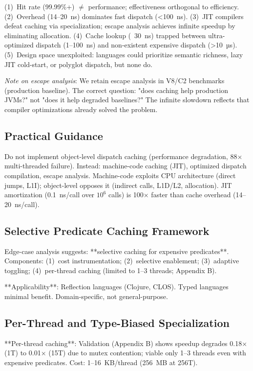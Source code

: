 \documentclass[sigplan,final,acmsmall,review,screen]{acmart}
\begin{document}
(1)~Hit rate (99.99\%+) $\neq$ performance; effectiveness orthogonal to efficiency. (2)~Overhead (14--20~ns) dominates fast dispatch (<100~ns). (3)~JIT compilers defeat caching via specialization; escape analysis achieves infinite speedup by eliminating allocation. (4)~Cache lookup (~30~ns) trapped between ultra-optimized dispatch (1--100~ns) and non-existent expensive dispatch (>10~µs). (5)~Design space unexploited: languages could prioritize semantic richness, lazy JIT cold-start, or polyglot dispatch, but none do.

\textit{Note on escape analysis}: We retain escape analysis in V8/C2 benchmarks (production baseline). The correct question: "does caching help production JVMs?" not "does it help degraded baselines?" The infinite slowdown reflects that compiler optimizations already solved the problem.

\subsection{Practical Guidance}

Do not implement object-level dispatch caching (performance degradation, 88× multi-threaded failure). Instead: machine-code caching (JIT), optimized dispatch compilation, escape analysis. Machine-code exploits CPU architecture (direct jumps, L1I); object-level opposes it (indirect calls, L1D/L2, allocation). JIT amortization (0.1~ns/call over $10^6$ calls) is 100× faster than cache overhead (14--20~ns/call).

\subsection{Selective Predicate Caching Framework}

Edge-case analysis suggests: **selective caching for expensive predicates**. Components: (1)~cost instrumentation; (2)~selective enablement; (3)~adaptive toggling; (4)~per-thread caching (limited to 1--3 threads; Appendix B).

**Applicability**: Reflection languages (Clojure, CLOS). Typed languages minimal benefit. Domain-specific, not general-purpose.

\subsection{Per-Thread and Type-Biased Specialization}

**Per-thread caching**: Validation (Appendix B) shows speedup degrades 0.18× (1T) to 0.01× (15T) due to mutex contention; viable only 1--3 threads even with expensive predicates. Cost: 1--16~KB/thread (256~MB at 256T).
\end{document}
